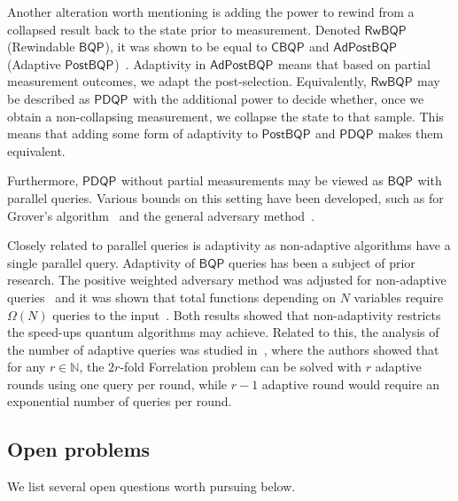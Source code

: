 \documentclass[10pt,a4paper]{article}
\newcommand{\compclass}[2][]{\ensuremath{\mathsf{#2}^{#1}}\xspace}
\newcommand{\pdqpname}[0]{\compclass{PDQP}}
\newcommand{\bqpname}[0]{\compclass{BQP}}
\newcommand{\postbqpname}[0]{\compclass{PostBQP}}
\newcommand{\copybqpname}[0]{\compclass{CBQP}}
\begin{document}
Another alteration worth mentioning is adding the power to rewind from a collapsed result back to the state prior to measurement. Denoted \compclass{RwBQP} (Rewindable \bqpname), it was shown to be equal to \copybqpname and \compclass{AdPostBQP} (Adaptive \postbqpname)~\cite{rewindable_bqp}. Adaptivity in \compclass{AdPostBQP} means that based on partial measurement outcomes, we adapt the post-selection. Equivalently, \compclass{RwBQP} may be described as \pdqpname with the additional power to decide whether, once we obtain a non-collapsing measurement, we collapse the state to that sample. This means that adding some form of adaptivity to \postbqpname and \pdqpname makes them equivalent.

Furthermore, \pdqpname without partial measurements may be viewed as \bqpname with parallel queries. Various bounds on this setting have been developed, such as for Grover's algorithm~\cite{grovers_search_optimal} and the general adversary method~\cite{optimal_parallel_query}.

Closely related to parallel queries is adaptivity as non-adaptive algorithms have a single parallel query. Adaptivity of $\mathsf{BQP}$ queries has been a subject of prior research. The positive weighted adversary method was adjusted for non-adaptive queries~\cite{nonadaptive_weighted_adversary} and it was shown that total functions depending on $N$ variables require $\Omega(N)$ queries to the input~\cite{nonadaptive_query_complexity}. Both results showed that non-adaptivity restricts the speed-ups quantum algorithms may achieve. Related to this, the analysis of the number of adaptive queries was studied in~\cite{power_of_adaptivity}, where the authors showed that for any $r\in \mathbb{N}$, the $2r$-fold Forrelation problem can be solved with $r$ adaptive rounds using one query per round, while $r-1$ adaptive round would require an exponential number of queries per round.

\subsection{Open problems}\label{subsection_open_problems}

We list several open questions worth pursuing below.
\end{document}
